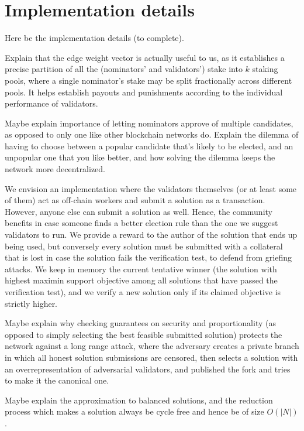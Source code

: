 \section{Implementation details}\label{s:implement}

Here be the implementation details (to complete).

Explain that the edge weight vector is actually useful to us, as it establishes a precise partition of all the (nominators' and validators') stake into $k$ staking pools, where a single nominator's stake may be split fractionally across different pools. It helps establish payouts and punishments according to the individual performance of validators.

Maybe explain importance of letting nominators approve of multiple candidates, as opposed to only one like other blockchain networks do. Explain the dilemma of having to choose between a popular candidate that's likely to be elected, and an unpopular one that you like better, and how solving the dilemma keeps the network more decentralized.


We envision an implementation where the validators themselves (or at least some of them) act as off-chain workers and submit a solution as a transaction. 
However, anyone else can submit a solution as well. Hence, the community benefits in case someone finds a better election rule than the one we suggest validators to run. We provide a reward to the author of the solution that ends up being used, but conversely every solution must be submitted with a collateral that is lost in case the solution fails the verification test, to defend from griefing attacks.
We keep in memory the current tentative winner (the solution with highest maximin support objective among all solutions that have passed the verification test), and we verify a new solution only if its claimed objective is strictly higher.

Maybe explain why checking guarantees on security and proportionality (as opposed to simply selecting the best feasible submitted solution) protects the network against a long range attack, where the adversary creates a private branch in which all honest solution submissions are censored, then selects a solution with an overrepresentation of adversarial validators, and published the fork and tries to make it the canonical one.

Maybe explain the approximation to balanced solutions, and the reduction process which makes a solution always be cycle free and hence be of size $O(|N|)$.

